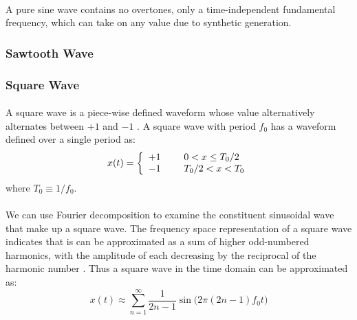 \documentclass[12pt,letterpaper]{article}
\begin{document}
\paragraph*{}A pure sine wave contains no overtones, only a time-independent fundamental frequency, which can take on any value due to synthetic generation.


\subsubsection{Sawtooth Wave}

\paragraph*{}


\subsubsection{Square Wave}

\paragraph*{}A square wave is a piece-wise defined waveform whose value alternatively alternates between $+1$ and $-1$ \cite{White,Olsen}. A square wave with period $f_0$ has a waveform defined over a single period as:
\begin{equation}
\label{eqn-SquareWave}
x(t) =  \left\{
\begin{array}{ll}
    +1 & \text{\hspace{0.5cm}} 0 < x \leq T_0 / 2 \\
    -1 & \text{\hspace{0.5cm}} T_0/2 < x < T_0
\end{array} 
\right.
\end{equation}
where $T_0 \equiv 1/f_0$.

\paragraph*{}We can use Fourier decomposition to examine the constituent sinusoidal wave that make up a square wave. The frequency space representation of a square wave indicates that is can be approximated as a sum of higher odd-numbered harmonics, with the amplitude of each decreasing by the reciprocal of the harmonic number \cite{White}. Thus a square wave in the time domain can be approximated as:
\begin{equation}
x(t) \approx \sum_{n = 1}^{\infty} \frac{1}{2n-1} \sin \bigg( 2 \pi (2n - 1)f_0 t \bigg)
\end{equation} 
\end{document}
